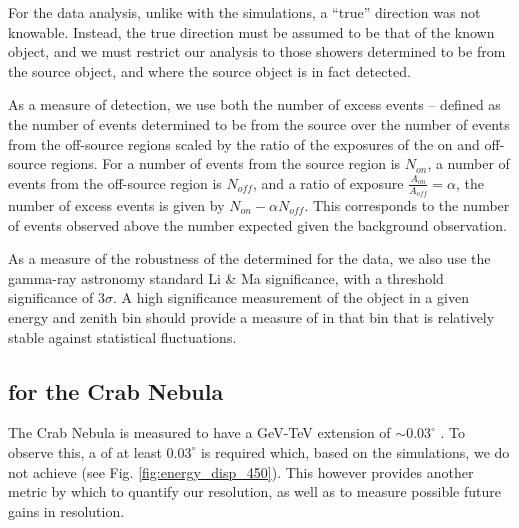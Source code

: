 \documentclass[main.tex]{subfiles}
\begin{document}
For the data analysis, unlike with the simulations, a ``true'' direction was not knowable. Instead, the true direction must be assumed to be that of the known object, and we must restrict our analysis to those showers determined to be from the source object, and where the source object is in fact detected.

As a measure of detection, we use both the number of excess events -- defined as the number of events determined to be from the source over the number of events from the off-source regions scaled by the ratio of the exposures of the on and off-source regions. For a number of events from the source region is $N_{on}$, a number of events from the off-source region is $N_{off}$, and a ratio of exposure $\frac{A_{on}}{A_{off}}=\alpha$, the number of excess events is given by $N_{on}-\alpha N_{off}$. This corresponds to the number of events observed above the number expected given the background observation.

As a measure of the robustness of the \rse determined for the data, we also use the gamma-ray astronomy standard Li \& Ma\cite{LiMa} significance, with a threshold significance of $3\sigma$. A high significance measurement of the object in a given energy and zenith bin should provide a measure of \rse in that bin that is relatively stable against statistical fluctuations.

\subsection{\rse for the Crab Nebula}

The Crab Nebula is measured to have a GeV-TeV extension of $\sim 0.03^\circ$ \cite{Fermi_LAT_Crab_extension}\cite{HESS_Crab_extension}. To observe this, a \rse of at least $0.03^\circ$ is required which, based on the simulations, we do not achieve (see Fig. \ref{fig:energy_disp_450}). This however provides another metric by which to quantify our resolution, as well as to measure possible future gains in resolution.

\end{document}
